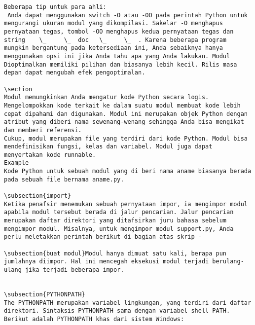 \begin{verbatim}
Beberapa tip untuk para ahli:  
 Anda dapat menggunakan switch -O atau -OO pada perintah Python untuk mengurangi ukuran modul yang dikompilasi. Sakelar -O menghapus pernyataan tegas, tombol -OO menghapus kedua pernyataan tegas dan string    \_     \_  doc   \_     \_  . Karena beberapa program mungkin bergantung pada ketersediaan ini, Anda sebaiknya hanya menggunakan opsi ini jika Anda tahu apa yang Anda lakukan. Modul Dioptimalkan memiliki pilihan dan biasanya lebih kecil. Rilis masa depan dapat mengubah efek pengoptimalan. 

\section
Modul memungkinkan Anda mengatur kode Python secara logis. Mengelompokkan kode terkait ke dalam suatu modul membuat kode lebih cepat dipahami dan digunakan. Modul ini merupakan objek Python dengan atribut yang diberi nama sewenang-wenang sehingga Anda bisa mengikat dan memberi referensi.
Cukup, modul merupakan file yang terdiri dari kode Python. Modul bisa mendefinisikan fungsi, kelas dan variabel. Modul juga dapat menyertakan kode runnable.
Example
Kode Python untuk sebuah modul yang di beri nama aname biasanya berada pada sebuah file bernama aname.py. 

\subsection{import}
Ketika penafsir menemukan sebuah pernyataan impor, ia mengimpor modul apabila modul tersebut berada di jalur pencarian. Jalur pencarian merupakan daftar direktori yang ditafsirkan juru bahasa sebelum mengimpor modul. Misalnya, untuk mengimpor modul support.py, Anda perlu meletakkan perintah berikut di bagian atas skrip - 
 
\subsection{buat modul}Modul hanya dimuat satu kali, berapa pun jumlahnya diimpor. Hal ini mencegah eksekusi modul terjadi berulang-ulang jika terjadi beberapa impor.
 

\subsection{PYTHONPATH} 
The PYTHONPATH merupakan variabel lingkungan, yang terdiri dari daftar direktori. Sintaksis PYTHONPATH sama dengan variabel shell PATH. 
Berikut adalah PYTHONPATH khas dari sistem Windows:
 

\end{verbatim}
